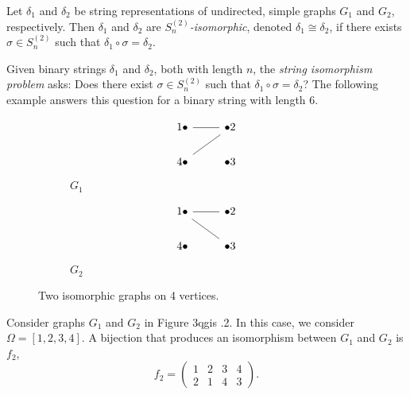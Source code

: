 \begin{definition}\label{def:def225}
Let $\delta_1$ and $\delta_2$ be string representations of undirected, simple graphs $G_1$ and $G_2$, respectively. Then $\delta_1$ and $\delta_2$ are $S_n^{(2)}$\textit{-isomorphic}, denoted $\delta_1\cong \delta_2$, if there exists $\sigma\in S_n^{(2)}$ such that $\delta_1\circ\sigma=\delta_2$.
\end{definition}
Given binary strings $\delta_1$ and $\delta_2$, both with length $n$, the \textit{string isomorphism problem} asks: Does there exist $\sigma\in S_n^{(2)}$ such that $\delta_1\circ\sigma=\delta_2$? The following example answers this question for a binary string with length 6.
\begin{example}\label{ex:ex221}
\begin{figure}[H]
\begin{subfigure}{.5\textwidth}
\[\begin{tikzcd}
	1\bullet & {\bullet 2} \\
	4\bullet & {\bullet 3}
	\arrow[no head, from=1-1, to=1-2]
	\arrow[no head, from=1-2, to=2-1]
\end{tikzcd}\]
\caption{$G_1$}
\end{subfigure}
\begin{subfigure}{.5\textwidth}
\[\begin{tikzcd}
	1\bullet & {\bullet 2} \\
	4\bullet & {\bullet 3}
	\arrow[no head, from=1-1, to=1-2]
	\arrow[no head, from=1-1, to=2-2]
\end{tikzcd}\]
\caption{$G_2$}
\end{subfigure}
\caption{Two isomorphic graphs on 4 vertices.}
\end{figure}
Consider graphs $G_1$ and $G_2$ in Figure 3qgis
.2. In this case, we consider $\Omega=[1,2,3,4]$. A bijection that produces an isomorphism between $G_1$ and $G_2$ is $f_2$,
\[f_2=\begin{pmatrix}1&2&3&4\\
2&1&4&3
\end{pmatrix}.\]

\end{example}
